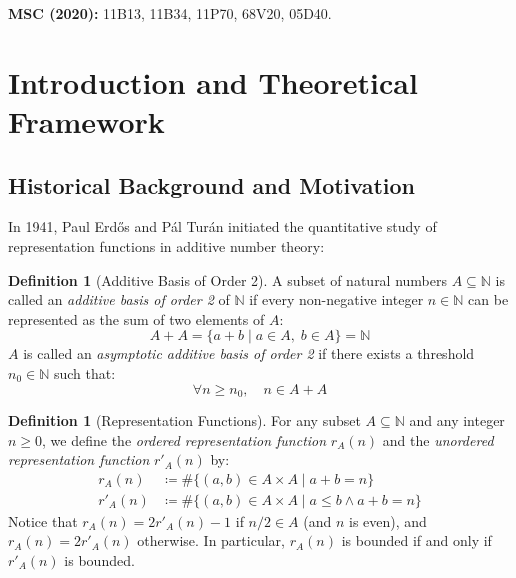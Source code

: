 \documentclass[11pt,a4paper]{article}
\theoremstyle{definition}
\newtheorem{definition}[theorem]{Definition}
\begin{document}
\noindent\textbf{MSC (2020):} 11B13, 11B34, 11P70, 68V20, 05D40.

\tableofcontents
\newpage

\section{Introduction and Theoretical Framework}

\subsection{Historical Background and Motivation}
In 1941, Paul Erd\H{o}s and P\'al Tur\'an \cite{erdos1941} initiated the quantitative study of representation functions in additive number theory:

\begin{definition}[Additive Basis of Order 2]\label{def:basis}
A subset of natural numbers $A \subseteq \mathbb{N}$ is called an \emph{additive basis of order 2} of $\mathbb{N}$ if every non-negative integer $n \in \mathbb{N}$ can be represented as the sum of two elements of $A$:
\begin{equation}\label{eq:basis_exact}
A + A = \{ a + b \mid a \in A, \; b \in A \} = \mathbb{N}
\end{equation}
$A$ is called an \emph{asymptotic additive basis of order 2} if there exists a threshold $n_0 \in \mathbb{N}$ such that:
\begin{equation}\label{eq:asymp_basis}
\forall n \ge n_0, \quad n \in A + A
\end{equation}
\end{definition}

\begin{definition}[Representation Functions]\label{def:rep_fn}
For any subset $A \subseteq \mathbb{N}$ and any integer $n \ge 0$, we define the \emph{ordered representation function} $r_A(n)$ and the \emph{unordered representation function} $r'_A(n)$ by:
\begin{align}
r_A(n) &\coloneqq \#\{(a, b) \in A \times A \mid a + b = n\} \label{eq:rep_ordered} \\
r'_A(n) &\coloneqq \#\{(a, b) \in A \times A \mid a \le b \land a + b = n\} \label{eq:rep_unordered}
\end{align}
Notice that $r_A(n) = 2 r'_A(n) - 1$ if $n/2 \in A$ (and $n$ is even), and $r_A(n) = 2 r'_A(n)$ otherwise.
In particular, $r_A(n)$ is bounded if and only if $r'_A(n)$ is bounded.
\end{definition}
\end{document}
